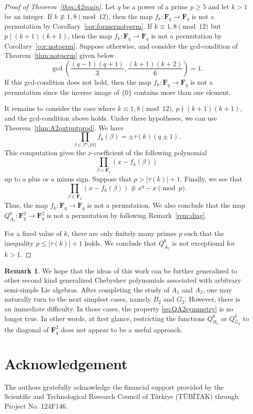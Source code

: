 \documentclass{amsart}
\newcommand{\mc}{\mathcal}
\newcommand{\F}{\mathbf F}
\numberwithin{equation}{section}
\theoremstyle{plain}
\theoremstyle{definition}
\newtheorem{remark}[theorem]{Remark}
\begin{document}
\begin{proof}[Proof of Theorem~\ref{thm:A2main}]
Let $q$ be a power of a prime $p\ge 5$ and let $k>1$ be an integer. If $k \not \equiv 1,8\pmod{12}$, then the map $f_k:\F_q\rightarrow\F_q$ is not a permutation by Corollary~\ref{cor:formernotperm}. If $k \equiv 1,8\pmod{12}$ but $p \mid (k+1)(k+1)$, then the map $f_k:\F_q\rightarrow\F_q$ is not a permutation by Corollary~\ref{cor:notperm}. Suppose otherwise, and consider the gcd-condition of Theorem~\ref{thm:notperm} given below
$$
\gcd\left(\frac{(q-1)(q+1)}{3}, \frac{(k+1)(k+2)}{6}\right)=1.
$$
If this gcd-condition does not hold, then the map $f_k:\F_q \rightarrow \F_q$ is not a permutation since the inverse image of $\{0\}$ contains more than one element. 

It remains to consider the case where $k\equiv 1,8 \pmod{12}$, $p \nmid (k+1)(k+1)$, and the gcd-condition above holds. Under these hypotheses, we can use Theorem~\ref{thm:A2outputprod}. We have
$$
\prod\limits_{\beta\in \mc{F}\setminus\{0\}} f_{k}(\beta)= \pm\tau(k) (q\pm1).
$$
This computation gives the $x$-coefficient of the following polynomial
$$\prod\limits_{\beta\in\F_q}\left(x-f_k(\beta)\right)$$
up to a plus or a minus sign. Suppose that $p>|\tau(k)|+1$. Finally, we see that 
$$\prod\limits_{\beta\in\F_q} \left(x-f_k(\beta) \right)\not\equiv x^q-x\pmod p.$$
Thus, the map $f_k:\F_q\rightarrow\F_q$ is not a permutation. We also conclude that the map $Q_{A_2}^k:\F_q^2\rightarrow\F_q^2$ is not a permutation by following Remark~\ref{rem:diag}.

For a fixed value of $k$, there are only finitely many primes $p$ such that the inequality $p \leq |\tau(k)|+1$ holds. We conclude that $Q_{A_2}^k$ is not exceptional for $k>1$.
\end{proof}

\begin{remark} We hope that the ideas of this work can be further generalized to other second kind generalized Chebyshev polynomials associated with arbitrary semi-simple Lie algebras. After completing the study of $A_1$ and $A_2$, one may naturally turn to the next simplest cases, namely $B_2$ and $G_2$. However, there is an immediate difficulty. In those cases, the property \eqref{eq:QA2symmetry} is no longer true. In other words, at first glance, restricting the functions $Q_{B_2}^k$ or $Q_{G_2}^k$ to the diagonal of $\F_q^2$ does not appear to be a useful approach.
\end{remark}

\section{Acknowledgement}
The authors gratefully acknowledge the financial support provided by the Scientific and Technological Research Council of Türkiye (TÜBİTAK) through Project No. 124F146.



\end{document}
